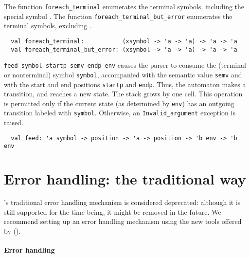 \documentclass[onecolumn,11pt,nocopyrightspace,preprint]{sigplanconf}
\begin{document}

The function \verb+foreach_terminal+ enumerates the terminal symbols, including the special symbol \error.
The function \verb+foreach_terminal_but_error+ enumerates the terminal symbols, excluding \error.
\begin{verbatim}
  val foreach_terminal:           (xsymbol -> 'a -> 'a) -> 'a -> 'a
  val foreach_terminal_but_error: (xsymbol -> 'a -> 'a) -> 'a -> 'a
\end{verbatim}


\verb+feed symbol startp semv endp env+ causes the parser to consume the
(terminal or nonterminal) symbol \verb+symbol+, accompanied with the semantic
value \verb+semv+ and with the start and end positions \verb+startp+ and
\verb+endp+. Thus, the automaton makes a transition, and reaches a new state.
The stack grows by one cell. This operation is permitted only if the current
state (as determined by \verb+env+) has an outgoing transition labeled with
\verb+symbol+. Otherwise, an \verb+Invalid_argument+ exception is raised.
\begin{verbatim}
  val feed: 'a symbol -> position -> 'a -> position -> 'b env -> 'b env
\end{verbatim}



\section{Error handling: the traditional way}
\label{sec:errors}

\menhir's traditional error handling mechanism is considered deprecated: although
it is still supported for the time being, it might be removed in the future.
%
We recommend setting up an error handling mechanism using the new tools
offered by \menhir ().

\paragraph{Error handling}
\end{document}
